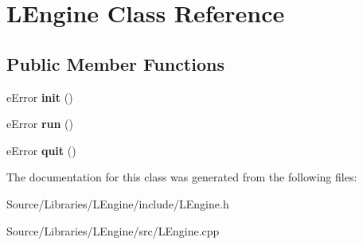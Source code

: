 \hypertarget{class_l_engine}{\section{L\-Engine Class Reference}
\label{class_l_engine}
}
\subsection*{Public Member Functions}
\begin{DoxyCompactItemize}
\item 
\hypertarget{class_l_engine_ac9dbd4fedf25c42bb0e573e4c48d1eb9}{e\-Error {\bfseries init} ()}\label{class_l_engine_ac9dbd4fedf25c42bb0e573e4c48d1eb9}

\item 
\hypertarget{class_l_engine_af232ceca2cbf1e0d083e62ef32e4c9b5}{e\-Error {\bfseries run} ()}\label{class_l_engine_af232ceca2cbf1e0d083e62ef32e4c9b5}

\item 
\hypertarget{class_l_engine_a28aae4a58cc000859bee6da7e9352fe5}{e\-Error {\bfseries quit} ()}\label{class_l_engine_a28aae4a58cc000859bee6da7e9352fe5}

\end{DoxyCompactItemize}


The documentation for this class was generated from the following files\-:\begin{DoxyCompactItemize}
\item 
Source/\-Libraries/\-L\-Engine/include/L\-Engine.\-h\item 
Source/\-Libraries/\-L\-Engine/src/L\-Engine.\-cpp\end{DoxyCompactItemize}
